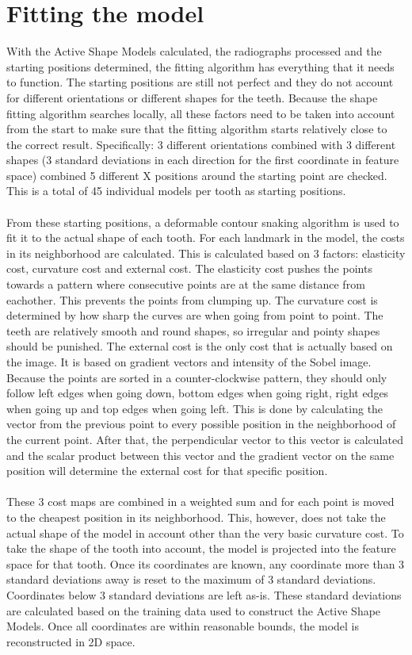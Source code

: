 \documentclass[a4paper,10pt]{article}
\begin{document}
\section{Fitting the model}
With the Active Shape Models calculated, the radiographs processed and the starting positions determined, the fitting algorithm has everything that it needs to function. The starting positions are still not perfect and they do not account for different orientations or different shapes for the teeth. Because the shape fitting algorithm searches locally, all these factors need to be taken into account from the start to make sure that the fitting algorithm starts relatively close to the correct result. Specifically: 3 different orientations combined with 3 different shapes (3 standard deviations in each direction for the first coordinate in feature space) combined 5 different X positions around the starting point are checked. This is a total of 45 individual models per tooth as starting positions.
\\\\
From these starting positions, a deformable contour snaking algorithm is used to fit it to the actual shape of each tooth. For each landmark in the model, the costs in its neighborhood are calculated. This is calculated based on 3 factors: elasticity cost, curvature cost and external cost. The elasticity cost pushes the points towards a pattern where consecutive points are at the same distance from eachother. This prevents the points from clumping up. The curvature cost is determined by how sharp the curves are when going from point to point. The teeth are relatively smooth and round shapes, so irregular and pointy shapes should be punished. The external cost is the only cost that is actually based on the image. It is based on gradient vectors and intensity of the Sobel image. Because the points are sorted in a counter-clockwise pattern, they should only follow left edges when going down, bottom edges when going right, right edges when going up and top edges when going left. This is done by calculating the vector from the previous point to every possible position in the neighborhood of the current point. After that, the perpendicular vector to this vector is calculated and the scalar product between this vector and the gradient vector on the same position will determine the external cost for that specific position.
\\\\
These 3 cost maps are combined in a weighted sum and for each point is moved to the cheapest position in its neighborhood. This, however, does not take the actual shape of the model in account other than the very basic curvature cost. To take the shape of the tooth into account, the model is projected into the feature space for that tooth. Once its coordinates are known, any coordinate more than 3 standard deviations away is reset to the maximum of 3 standard deviations. Coordinates below 3 standard deviations are left as-is. These standard deviations are calculated based on the training data used to construct the Active Shape Models. Once all coordinates are within reasonable bounds, the model is reconstructed in 2D space.
\end{document}
